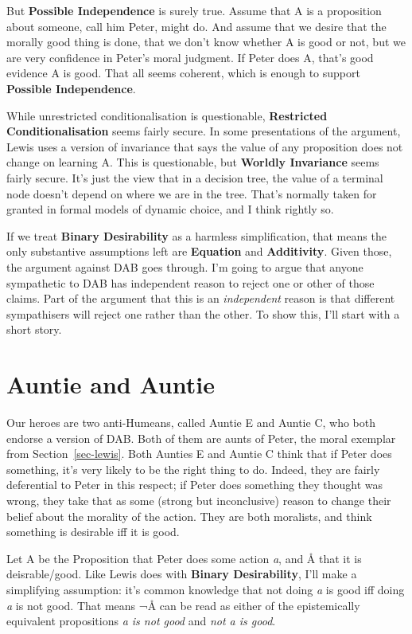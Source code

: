 \documentclass[
  11pt,
  letterpaper,
  DIV=11,
  numbers=noendperiod,
  twoside]{scrartcl}
\begin{document}
But \textbf{Possible Independence} is surely true. Assume that A is a
proposition about someone, call him Peter, might do. And assume that we
desire that the morally good thing is done, that we don't know whether A
is good or not, but we are very confidence in Peter's moral judgment. If
Peter does A, that's good evidence A is good. That all seems coherent,
which is enough to support \textbf{Possible Independence}.

While unrestricted conditionalisation is questionable,
\textbf{Restricted Conditionalisation} seems fairly secure. In some
presentations of the argument, Lewis uses a version of invariance that
says the value of any proposition does not change on learning A. This is
questionable, but \textbf{Worldly Invariance} seems fairly secure. It's
just the view that in a decision tree, the value of a terminal node
doesn't depend on where we are in the tree. That's normally taken for
granted in formal models of dynamic choice, and I think rightly so.

If we treat \textbf{Binary Desirability} as a harmless simplification,
that means the only substantive assumptions left are \textbf{Equation}
and \textbf{Additivity}. Given those, the argument against DAB goes
through. I'm going to argue that anyone sympathetic to DAB has
independent reason to reject one or other of those claims. Part of the
argument that this is an \emph{independent} reason is that different
sympathisers will reject one rather than the other. To show this, I'll
start with a short story.

\section{Auntie and Auntie}\label{sec-auntie}

Our heroes are two anti-Humeans, called Auntie E and Auntie C, who both
endorse a version of DAB. Both of them are aunts of Peter, the moral
exemplar from Section~\ref{sec-lewis}. Both Aunties E and Auntie C think
that if Peter does something, it's very likely to be the right thing to
do. Indeed, they are fairly deferential to Peter in this respect; if
Peter does something they thought was wrong, they take that as some
(strong but inconclusive) reason to change their belief about the
morality of the action. They are both moralists, and think something is
desirable iff it is good.

Let A be the Proposition that Peter does some action \emph{a}, and Å
that it is deisrable/good. Like Lewis does with \textbf{Binary
Desirability}, I'll make a simplifying assumption: it's common knowledge
that not doing \emph{a} is good iff doing \emph{a} is not good. That
means ¬Å can be read as either of the epistemically equivalent
propositions \emph{a is not good} and \emph{not a is good}.
\end{document}
